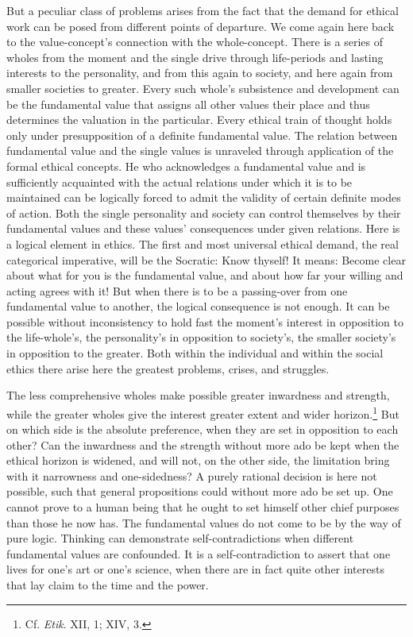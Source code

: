 \documentclass[12pt,a4paper]{book}
\newcommand{\opage}[1]{\marginnote{\footnotesize\textit{[#1]}}}
\begin{document}
But a peculiar class of problems arises from the fact that the demand for ethical work can be posed from
different points of departure. We come again here back to the value-concept's connection with the
whole-concept. There is a series of wholes from the moment and the single drive through life-periods and
lasting interests to the personality, and from this again to society, and here again from smaller societies
to greater. Every such whole's subsistence and development can be the fundamental value that assigns all
other values their place and thus determines the valuation in the particular. Every ethical train of thought
holds only under presupposition of a definite fundamental value. The relation between \opage{360}fundamental value and
the single values is unraveled through application of the formal ethical concepts. He who acknowledges a
fundamental value and is sufficiently acquainted with the actual relations under which it is to be maintained
can be logically forced to admit the validity of certain definite modes of action. Both the single
personality and society can control themselves by their fundamental values and these values' consequences
under given relations. Here is a logical element in ethics. The first and most universal ethical demand, the
real categorical imperative, will be the Socratic: Know thyself! It means: Become clear about what for you is
the fundamental value, and about how far your willing and acting agrees with it! But when there is to be a
passing-over from one fundamental value to another, the logical consequence is not enough. It can be possible
without inconsistency to hold fast the moment's interest in opposition to the life-whole's, the personality's
in opposition to society's, the smaller society's in opposition to the greater. Both within the individual and
within the social ethics there arise here the greatest problems, crises, and struggles.

The less comprehensive wholes make possible greater inwardness and strength, while the greater wholes give the
interest greater extent and wider horizon.\footnote{Cf. \emph{Etik}. XII, 1; XIV, 3.} But on which side is the
absolute preference, when they are set in opposition to each other? Can the inwardness and the strength without
more ado be kept when the ethical horizon is widened, and will not, on the other side, the limitation bring
with it narrowness and one-sidedness? A purely rational decision is here not possible, such that general
propositions could without more ado be set up. One cannot prove to a human being that he ought to set himself
other chief purposes than those he now has. The fundamental values do not come to be by the way of pure logic.
Thinking can demonstrate self-contradictions when different fundamental values are confounded. It is a
self-contradiction to assert that one lives for one's art or one's science, when there are in fact quite other
interests that lay claim to the time and the power.
\end{document}
